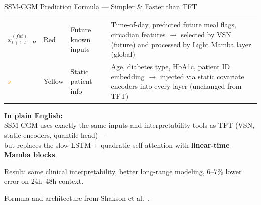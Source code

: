 \documentclass[aspectratio=169,xcolor=dvipsnames]{beamer}
\begin{document}
\begin{frame}{SSM-CGM Prediction Formula — Simpler \& Faster than TFT}
\begin{block}{}
\begin{tabular}{@{}lllp{7cm}@{}}
\textcolor{BrickRed}{$x^{(fut)}_{t+1:t+H}$} 
    & Red 
    & Future known inputs 
    & Time-of-day, predicted future meal flags, circadian features $\to$ selected by \alert{VSN (future)} and processed by \alert{Light Mamba layer (global)} \\[6pt]

\textcolor{Orange}{$s$} 
    & Yellow 
    & Static patient info 
    & Age, diabetes type, HbA1c, patient ID embedding $\to$ injected via \alert{static covariate encoders} into every layer (unchanged from TFT) \\
\bottomrule
\end{tabular}
\end{block}

\vspace{0.8em}
\normalsize
\textbf{In plain English:} \\
SSM-CGM uses \alert{exactly the same inputs and interpretability tools as TFT} (VSN, static encoders, quantile head) — \\
but replaces the slow LSTM + quadratic self-attention with \textbf{linear-time Mamba blocks}.

Result: same clinical interpretability, better long-range modeling, 6–7\% lower error on 24h–48h context.

\vspace{0.8em}
\footnotesize
Formula and architecture from Shakson et al.~\cite{shakson2025ssmcgm}.
\end{frame}
\end{document}
